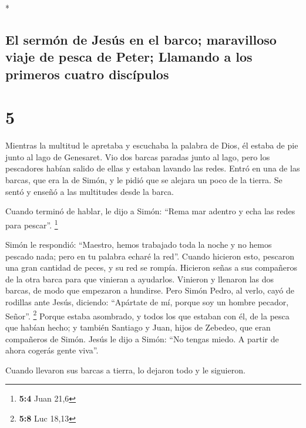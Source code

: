 \begin{paracol}{2}
\begin{otherlanguage}{english}
\end{otherlanguage}

\switchcolumn[0]*

\hypertarget{el-sermuxf3n-de-jesuxfas-en-el-barco-maravilloso-viaje-de-pesca-de-peter-llamando-a-los-primeros-cuatro-discuxedpulos}{%
\subsection{El sermón de Jesús en el barco; maravilloso viaje de pesca
de Peter; Llamando a los primeros cuatro
discípulos}\label{el-sermuxf3n-de-jesuxfas-en-el-barco-maravilloso-viaje-de-pesca-de-peter-llamando-a-los-primeros-cuatro-discuxedpulos}}

\hypertarget{section-8}{%
\section{5}\label{section-8}}

 Mientras la multitud le apretaba y escuchaba la palabra
de Dios, él estaba de pie junto al lago de Genesaret.  Vio
dos barcas paradas junto al lago, pero los pescadores habían salido de
ellas y estaban lavando las redes.  Entró en una de las
barcas, que era la de Simón, y le pidió que se alejara un poco de la
tierra. Se sentó y enseñó a las multitudes desde la barca.

 Cuando terminó de hablar, le dijo a Simón: ``Rema mar
adentro y echa las redes para pescar''. \footnote{\textbf{5:4} Juan 21,6}

 Simón le respondió: ``Maestro, hemos trabajado toda la
noche y no hemos pescado nada; pero en tu palabra echaré la red''.
 Cuando hicieron esto, pescaron una gran cantidad de
peces, y su red se rompía.  Hicieron señas a sus
compañeros de la otra barca para que vinieran a ayudarlos. Vinieron y
llenaron las dos barcas, de modo que empezaron a hundirse.
 Pero Simón Pedro, al verlo, cayó de rodillas ante Jesús,
diciendo: ``Apártate de mí, porque soy un hombre pecador, Señor''.
\footnote{\textbf{5:8} Luc 18,13}  Porque estaba
asombrado, y todos los que estaban con él, de la pesca que habían hecho;
 y también Santiago y Juan, hijos de Zebedeo, que eran
compañeros de Simón. Jesús le dijo a Simón: ``No tengas miedo. A partir
de ahora cogerás gente viva''.

 Cuando llevaron sus barcas a tierra, lo dejaron todo y
le siguieron.


\end{paracol}
